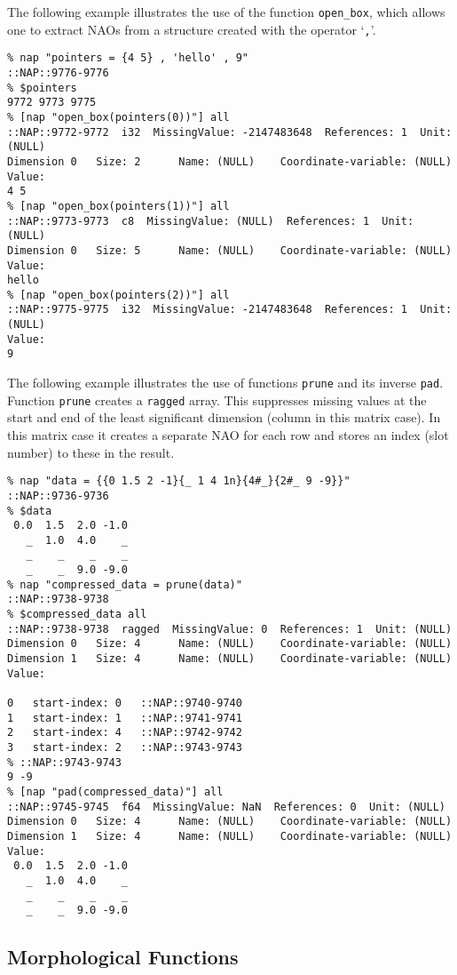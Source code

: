   \par The following example illustrates the use of the function 
  \texttt{open\_box}, which allows one to extract NAOs from a
  structure created with the operator `\texttt{,}'.
  \begin{verbatim}
% nap "pointers = {4 5} , 'hello' , 9"
::NAP::9776-9776
% $pointers
9772 9773 9775
% [nap "open_box(pointers(0))"] all
::NAP::9772-9772  i32  MissingValue: -2147483648  References: 1  Unit:
(NULL)
Dimension 0   Size: 2      Name: (NULL)    Coordinate-variable: (NULL)
Value:
4 5
% [nap "open_box(pointers(1))"] all
::NAP::9773-9773  c8  MissingValue: (NULL)  References: 1  Unit: (NULL)
Dimension 0   Size: 5      Name: (NULL)    Coordinate-variable: (NULL)
Value:
hello
% [nap "open_box(pointers(2))"] all
::NAP::9775-9775  i32  MissingValue: -2147483648  References: 1  Unit:
(NULL)
Value:
9
\end{verbatim}

  \par The following example illustrates the use of functions 
  \texttt{prune} and its inverse 
  \texttt{pad}. Function 
  \texttt{prune} creates a 
  \texttt{ragged} array. This suppresses missing values at the
  start and end of the least significant dimension (column in this
  matrix case). In this matrix case it creates a separate NAO for each
  row and stores an index (slot number) to these in the result.
  \begin{verbatim}
% nap "data = {{0 1.5 2 -1}{_ 1 4 1n}{4#_}{2#_ 9 -9}}"
::NAP::9736-9736
% $data
 0.0  1.5  2.0 -1.0
   _  1.0  4.0    _
   _    _    _    _
   _    _  9.0 -9.0
% nap "compressed_data = prune(data)"
::NAP::9738-9738
% $compressed_data all
::NAP::9738-9738  ragged  MissingValue: 0  References: 1  Unit: (NULL)
Dimension 0   Size: 4      Name: (NULL)    Coordinate-variable: (NULL)
Dimension 1   Size: 4      Name: (NULL)    Coordinate-variable: (NULL)
Value:

0   start-index: 0   ::NAP::9740-9740
1   start-index: 1   ::NAP::9741-9741
2   start-index: 4   ::NAP::9742-9742
3   start-index: 2   ::NAP::9743-9743
% ::NAP::9743-9743
9 -9
% [nap "pad(compressed_data)"] all
::NAP::9745-9745  f64  MissingValue: NaN  References: 0  Unit: (NULL)
Dimension 0   Size: 4      Name: (NULL)    Coordinate-variable: (NULL)
Dimension 1   Size: 4      Name: (NULL)    Coordinate-variable: (NULL)
Value:
 0.0  1.5  2.0 -1.0
   _  1.0  4.0    _
   _    _    _    _
   _    _  9.0 -9.0
\end{verbatim}

  \subsection{
    \label{Morphological}Morphological Functions
  }

